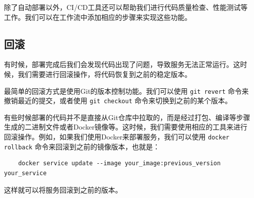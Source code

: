 除了自动部署以外，CI/CD工具还可以帮助我们进行代码质量检查、性能测试等工作。我们可以在工作流中添加相应的步骤来实现这些功能。

\subsection{回滚}

有时候，部署完成后我们会发现代码出现了问题，导致服务无法正常运行。这时候，我们需要进行回滚操作，将代码恢复到之前的稳定版本。

最简单的回滚方式是使用Git的版本控制功能。我们可以使用 \texttt{git revert} 命令来撤销最近的提交，或者使用 \texttt{git checkout} 命令来切换到之前的某个版本。

有些时候部署的代码并不是直接从Git仓库中拉取的，而是经过打包、编译等步骤生成的二进制文件或者Docker镜像等。这时候，我们需要使用相应的工具来进行回滚操作。例如，如果我们使用Docker来部署服务，我们可以使用 \texttt{docker rollback} 命令来回滚到之前的镜像版本，也就是：
\begin{verbatim}
    docker service update --image your_image:previous_version your_service
\end{verbatim}
这样就可以将服务回滚到之前的版本。
